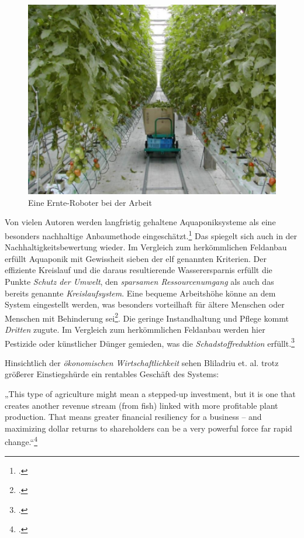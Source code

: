 \documentclass{scrartcl}
\begin{document}
\begin{figure}[htbp]
\centering
\includegraphics[width=14cm]{image_folder/automatisation_kondo.png}
\caption{Eine Ernte-Roboter bei der Arbeit}
\label{fig:Automatisierung}
\end{figure}

Von vielen Autoren werden langfristig gehaltene Aquaponiksysteme als eine besonders nachhaltige Anbaumethode eingeschätzt.\footcites[Vgl.][S.6]{Blidariu2011NcreasingAquaponics-Review}[S.10]{Al-Kodmany2018TheCity}[S.36]{TysonV.2007ReconcilingMedium}[S.37]{Spring2012DerBasel-Stadt} Das spiegelt sich auch in der Nachhaltigkeitsbewertung wieder. Im Vergleich zum herkömmlichen Feldanbau erfüllt Aquaponik mit Gewissheit sieben der elf genannten Kriterien.
Der effiziente Kreislauf und die daraus resultierende Wasserersparnis erfüllt die Punkte \textit{Schutz der Umwelt}, den \textit{sparsamen Ressourcenumgang} als auch das bereits genannte \textit{Kreislaufsystem}. Eine bequeme Arbeitshöhe könne an dem System eingestellt werden, was besonders vorteilhaft für ältere Menschen oder Menschen mit Behinderung sei\footcite[Vgl.][S.6]{Blidariu2011NcreasingAquaponics-Review}. Die geringe Instandhaltung und Pflege kommt \textit{Dritten} zugute. Im Vergleich zum herkömmlichen Feldanbau werden hier Pestizide oder künstlicher Dünger gemieden, was die \textit{Schadstoffreduktion} erfüllt.\footcite[Vgl.][S.10]{Al-Kodmany2018TheCity}

Hinsichtlich der \textit{ökonomischen Wirtschaftlichkeit} sehen Bliladriu et. al. trotz größerer Einstiegshürde ein rentables Geschäft des Systems:
\begin{displayquote}
„This type of agriculture might mean a stepped-up investment, but it is one that creates another revenue stream (from fish) linked with more profitable plant production. That means greater financial resiliency for a business – and maximizing dollar returns to shareholders can be a very powerful force far rapid change.“\footcite[Vgl.][S.6]{Blidariu2011NcreasingAquaponics-Review}
\end{displayquote}
\end{document}
